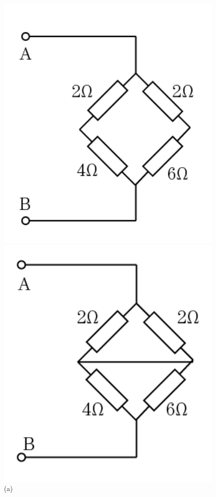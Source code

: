 \documentclass[hyperref, UTF8]{ctexart}
\begin{document}
\begin{figure}[!htb]
  \centering
  \begin{minipage}[t]{0.192\textwidth}
    \centering
    \includegraphics[width=1\textwidth]{p2-1-a.png}
    \caption*{(a)}
  \end{minipage}
  \begin{minipage}[t]{0.184\textwidth}
    \centering
    \includegraphics[width=1\textwidth]{p2-1-b.png}

\end{minipage}
\end{figure}
\end{document}
